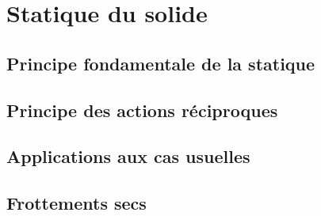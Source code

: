 \chapter{Statique du solide}
\section{Principe fondamentale de la statique}
\section{Principe des actions réciproques}
\section{Applications aux cas usuelles}
\section{Frottements secs}